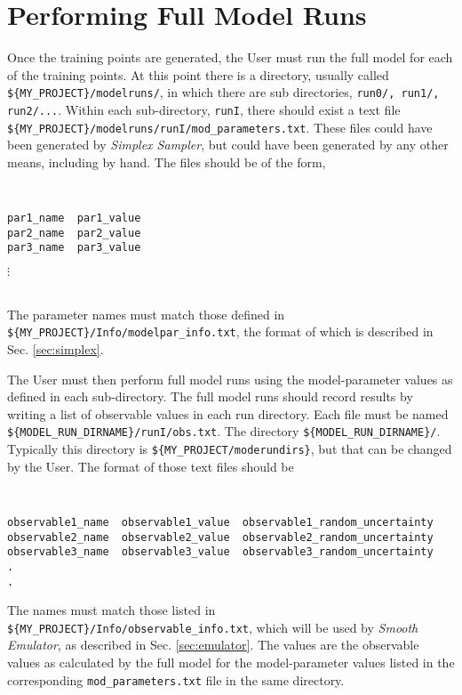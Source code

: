 \documentclass[UserManual.tex]{subfiles}
\begin{document}
\setcounter{section}{3}
\section{Performing Full Model Runs}\label{sec:fullmodel}

Once the training points are generated, the User must run the full model for each of the training points. At this point there is a directory, usually called {\tt \$\{MY\_PROJECT\}/modelruns/}, in which there are sub directories, {\tt run0/, run1/, run2/...}.  Within each sub-directory, {\tt runI}, there should exist a text file {\tt \$\{MY\_PROJECT\}/modelruns/runI/mod\_parameters.txt}. These files could have been generated by {\it Simplex Sampler}, but could have been generated by any other means, including by hand. The files should be of the form,
{\tt
\begin{verbatim}
par1_name  par1_value
par2_name  par2_value
par3_name  par3_value
\end{verbatim}\vspace*{-20pt}\hspace*{24pt}$\vdots$
}\\
The parameter names must match those defined in {\tt \$\{MY\_PROJECT\}/Info/modelpar\_info.txt}, the format of which is described in Sec. \ref{sec:simplex}. 

The User must then perform full model runs using the model-parameter values as defined in each sub-directory. The full model runs should record results by writing a list of observable values in each run directory. Each file must be named {\tt \$\{MODEL\_RUN\_DIRNAME\}/runI/obs.txt}. The directory {\tt \$\{MODEL\_RUN\_DIRNAME\}/}. Typically this directory is {\tt \$\{MY\_PROJECT/moderundirs\}}, but that can be changed by the User. The format of those text files should be
{\tt
\begin{verbatim}
observable1_name  observable1_value  observable1_random_uncertainty
observable2_name  observable2_value  observable2_random_uncertainty
observable3_name  observable3_value  observable3_random_uncertainty
.
.
\end{verbatim}
}
The names must match those listed in {\tt \$\{MY\_PROJECT\}/Info/observable\_info.txt}, which will be used by {\it Smooth Emulator}, as described in Sec. \ref{sec:emulator}. The values are the observable values as calculated by the full model for the model-parameter values listed in the corresponding {\tt mod\_parameters.txt} file in the same directory.
\end{document}
